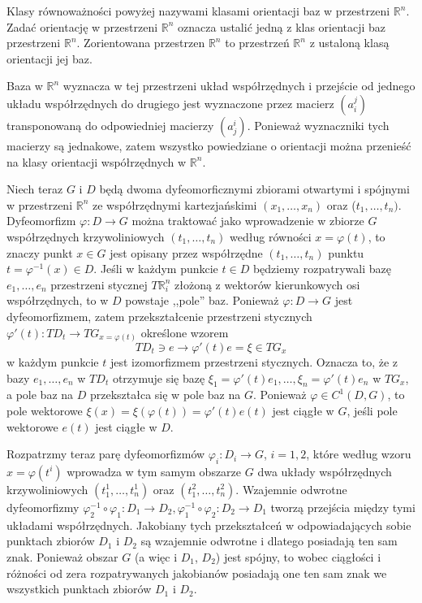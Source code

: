 \documentclass[leqno]{article}
\begin{document}
\begin{justify}
\begin{defn}
    Klasy równoważności powyżej nazywami klasami orientacji baz w przestrzeni $\mathbb{R}^n$. Zadać orientację w przestrzeni $\mathbb{R}^n$ oznacza ustalić jedną z klas 
    orientacji baz przestrzeni $\mathbb{R}^n$. Zorientowana przestrzen $\mathbb{R}^n$ to przestrzeń $\mathbb{R}^n$ z ustaloną klasą orientacji jej baz.
\end{defn}

Baza w $\mathbb{R}^n$ wyznacza w tej przestrzeni układ współrzędnych i przejście od jednego układu współrzędnych do drugiego jest wyznaczone przez macierz $(a_i^j)$ transponowaną 
do odpowiedniej macierzy $(a_j^i)$. Ponieważ wyznaczniki tych macierzy są jednakowe, zatem wszystko powiedziane o orientacji można przenieść na klasy orientacji współrzędnych w $\mathbb{R}^n$.

Niech teraz $G$ i $D$ będą dwoma dyfeomorficznymi zbiorami otwartymi i spójnymi w przestrzeni $\mathbb{R}^n$ ze współrzędnymi kartezjańskimi $(x_1, \ldots, x_n)$ oraz 
($t_1, \ldots, t_n)$. Dyfeomorfizm $\varphi : D \to G$ można traktować jako wprowadzenie w zbiorze $G$ współrzędnych krzywoliniowych $(t_1, \ldots, t_n)$ według 
równości $x = \varphi(t)$, to znaczy punkt $x \in G$ jest opisany przez współrzędne $(t_1, \ldots, t_n)$ punktu $t = \varphi^{-1}(x) \in D$.
Jeśli w każdym punkcie $t \in D$ będziemy rozpatrywali bazę $e_1, \ldots, e_n$ przestrzeni stycznej $T\mathbb{R}^n_i$ złożoną z wektorów 
kierunkowych osi współrzędnych, to w $D$ powstaje ,,pole'' baz. Ponieważ $\varphi : D \to G$ jest dyfeomorfizmem, zatem przekształcenie przestrzeni stycznych 
$\varphi'(t) : TD_t \to TG_{x = \varphi(t)}$ określone wzorem 
\[
    TD_t \ni e \to \varphi'(t)e = \xi \in TG_x
\]
w każdym punkcie $t$ jest izomorfizmem przestrzeni stycznych. Oznacza to, że z bazy $e_1, \ldots, e_n$ w $TD_t$ otrzymuje się bazę
$\xi_1 = \varphi'(t)e_1, \ldots, \xi_n = \varphi'(t)e_n$ w $TG_x$, a pole baz na $D$ przekształca się w pole baz na $G$.
Ponieważ $\varphi \in C^1(D, G)$, to pole wektorowe $\xi(x) = \xi(\varphi(t)) = \varphi'(t)e(t)$ jest ciągłe w $G$, jeśli pole wektorowe $e(t)$
jest ciągłe w $D$.

Rozpatrzmy teraz parę dyfeomorfizmów $\varphi_i : D_i \to G$, $i = 1,2$, które według wzoru $x = \varphi(t^i)$ wprowadza w tym samym obszarze $G$
dwa układy współrzędnych krzywoliniowych $(t_1^1, \ldots, t_n^1)$ oraz $(t_1^2, \ldots, t_n^2)$. Wzajemnie odwrotne dyfeomorfizmy $\varphi^{-1}_2 \circ \varphi_1 :
D_1 \to D_2, \varphi_1^{-1} \circ \varphi_2 : D_2 \to D_1$ tworzą przejścia między tymi układami współrzędnych.
Jakobiany tych przekształceń w odpowiadających sobie punktach zbiorów $D_1$ i $D_2$ są wzajemnie odwrotne i dlatego posiadają ten sam znak.
Ponieważ obszar $G$ (a więc i $D_1$, $D_2$) jest spójny, to wobec ciągłości i różności od zera rozpatrywanych jakobianów posiadają one ten sam znak we wszystkich 
punktach zbiorów $D_1$ i $D_2$. 


\end{justify}
\end{document}
